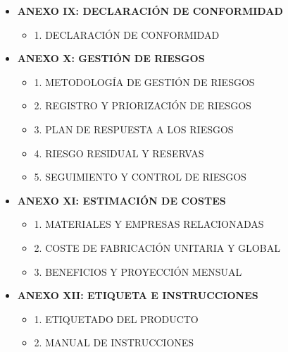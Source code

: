 \documentclass[11pt,a4paper]{article}
\begin{document}
\begin{itemize}[label={}, leftmargin=0cm, itemsep=1.2em]
\begin{itemize}[label=\color{ArthroTeal}\textbullet, leftmargin=0.6cm, itemsep=0.5em, topsep=0.3cm]
\begin{itemize}[label=\color{ArthroGray}\circ, leftmargin=0.5cm, itemsep=0.2em, topsep=0.1cm]
        \end{itemize}
        
        \item \textbf{ANEXO IX: DECLARACIÓN DE CONFORMIDAD} 
        \begin{itemize}[label=\color{ArthroGray}\circ, leftmargin=0.5cm, itemsep=0.2em, topsep=0.1cm]
            \small
            \item 1. DECLARACIÓN DE CONFORMIDAD 
            
        \end{itemize}
        
        \item \textbf{ANEXO X: GESTIÓN DE RIESGOS} 
        \begin{itemize}[label=\color{ArthroGray}\circ, leftmargin=0.5cm, itemsep=0.2em, topsep=0.1cm]
            \small
            \item 1. METODOLOGÍA DE GESTIÓN DE RIESGOS 
            \item 2. REGISTRO Y PRIORIZACIÓN DE RIESGOS
            \item 3. PLAN DE RESPUESTA A LOS RIESGOS
            \item 4. RIESGO RESIDUAL Y RESERVAS 
            \item 5. SEGUIMIENTO Y CONTROL DE RIESGOS 
        \end{itemize}
        
        \item \textbf{ANEXO XI: ESTIMACIÓN DE COSTES} 
        \begin{itemize}[label=\color{ArthroGray}\circ, leftmargin=0.5cm, itemsep=0.2em, topsep=0.1cm]
            \small
            \item 1. MATERIALES Y EMPRESAS RELACIONADAS
            \item 2. COSTE DE FABRICACIÓN UNITARIA Y GLOBAL 
            \item 3. BENEFICIOS Y PROYECCIÓN MENSUAL 
        \end{itemize}
        
        \item \textbf{ANEXO XII: ETIQUETA E INSTRUCCIONES} 
        \begin{itemize}[label=\color{ArthroGray}\circ, leftmargin=0.5cm, itemsep=0.2em, topsep=0.1cm]
            \small
            \item 1. ETIQUETADO DEL PRODUCTO 
            \item 2. MANUAL DE INSTRUCCIONES 
        \end{itemize}


\end{itemize}
\end{itemize}
\end{document}
